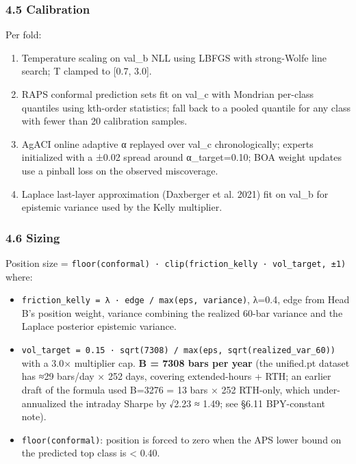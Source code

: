 \documentclass[
]{article}
\providecommand{\tightlist}{%
  \setlength{\itemsep}{0pt}\setlength{\parskip}{0pt}}
\begin{document}
\subsubsection{4.5 Calibration}\label{calibration}

Per fold:

\begin{enumerate}
\def\labelenumi{\arabic{enumi}.}
\tightlist
\item
  Temperature scaling on val\_b NLL using LBFGS with strong-Wolfe line
  search; T clamped to {[}0.7, 3.0{]}.
\item
  RAPS conformal prediction sets fit on val\_c with Mondrian per-class
  quantiles using kth-order statistics; fall back to a pooled quantile
  for any class with fewer than 20 calibration samples.
\item
  AgACI online adaptive α replayed over val\_c chronologically; experts
  initialized with a ±0.02 spread around α\_target=0.10; BOA weight
  updates use a pinball loss on the observed miscoverage.
\item
  Laplace last-layer approximation (Daxberger et al. 2021) fit on val\_b
  for epistemic variance used by the Kelly multiplier.
\end{enumerate}

\subsubsection{4.6 Sizing}\label{sizing}

Position size =
\texttt{floor(conformal)\ ·\ clip(friction\_kelly\ ·\ vol\_target,\ ±1)}
where:

\begin{itemize}
\tightlist
\item
  \texttt{friction\_kelly\ =\ λ\ ·\ edge\ /\ max(eps,\ variance)},
  λ=0.4, edge from Head B's position weight, variance combining the
  realized 60-bar variance and the Laplace posterior epistemic variance.
\item
  \texttt{vol\_target\ =\ 0.15\ ·\ sqrt(7308)\ /\ max(eps,\ sqrt(realized\_var\_60))}
  with a 3.0× multiplier cap. \textbf{B = 7308 bars per year} (the
  unified.pt dataset has ≈29 bars/day × 252 days, covering
  extended-hours + RTH; an earlier draft of the formula used B=3276 = 13
  bars × 252 RTH-only, which under-annualized the intraday Sharpe by
  √2.23 ≈ 1.49; see §6.11 BPY-constant note).
\item
  \texttt{floor(conformal)}: position is forced to zero when the APS
  lower bound on the predicted top class is \textless{} 0.40.
\end{itemize}
\end{document}
